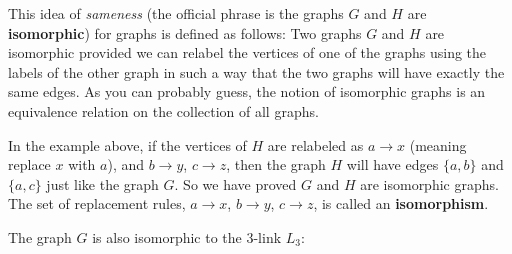 \begin{center}
         \hskip 50pt
\end{center}

This idea of {\it sameness} (the official phrase is  the graphs $G$ and $H$ are {\bfseries isomorphic}) for graphs is defined as follows: Two graphs $G$ and $H$ are isomorphic provided we can relabel the vertices of one of the graphs using the labels of the other graph in such a way that the two graphs will have exactly the same edges. As you can probably guess, the notion of isomorphic graphs is an equivalence relation on the collection of all graphs.

In the example above, if the vertices of $H$ are relabeled as $a\to x$ (meaning replace $x$ with $a$), and 
$b\to y$, $c\to z$, then the graph $H$ will have edges $\{a,b\}$ and $\{a,c\}$ just like the graph $G$. So we have proved $G$ and $H$ are isomorphic graphs. The set of  replacement rules, $a\to x$, $b\to y$, $c\to z$, is called
an {\bfseries isomorphism}.

The graph $G$ is also isomorphic to the $3$-link $L_{3}$: 
\begin{center}
\end{center}    

